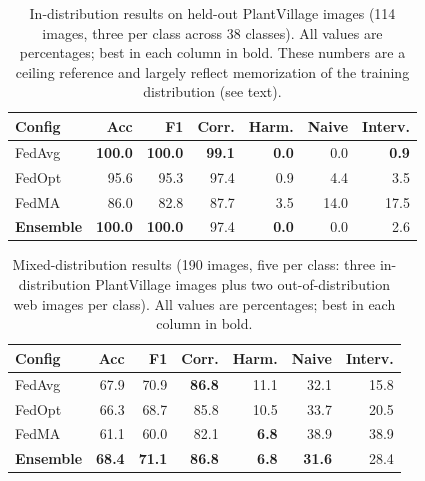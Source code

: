 \documentclass[conference]{IEEEtran}
\begin{document}
\begin{table}[t]
\centering
\caption{In-distribution results on held-out PlantVillage images (114 images, three per class across 38 classes). All values are percentages; best in each column in bold. These numbers are a ceiling reference and largely reflect memorization of the training distribution (see text).}
\label{tab:results_id}
\small
\setlength{\tabcolsep}{4pt}
\begin{tabular}{lrrrrrr}
\toprule
\textbf{Config} & \textbf{Acc} & \textbf{F1} & \textbf{Corr.} & \textbf{Harm.} & \textbf{Naive} & \textbf{Interv.} \\
\midrule
FedAvg & \textbf{100.0} & \textbf{100.0} & \textbf{99.1} & \textbf{0.0} & 0.0 & \textbf{0.9} \\
FedOpt & 95.6 & 95.3 & 97.4 & 0.9 & 4.4 & 3.5 \\
FedMA & 86.0 & 82.8 & 87.7 & 3.5 & 14.0 & 17.5 \\
\textbf{Ensemble} & \textbf{100.0} & \textbf{100.0} & 97.4 & \textbf{0.0} & 0.0 & 2.6 \\
\bottomrule
\end{tabular}
\end{table}

\begin{table}[t]
\centering
\caption{Mixed-distribution results (190 images, five per class: three in-distribution PlantVillage images plus two out-of-distribution web images per class). All values are percentages; best in each column in bold.}
\label{tab:results_mixed}
\small
\setlength{\tabcolsep}{4pt}
\begin{tabular}{lrrrrrr}
\toprule
\textbf{Config} & \textbf{Acc} & \textbf{F1} & \textbf{Corr.} & \textbf{Harm.} & \textbf{Naive} & \textbf{Interv.} \\
\midrule
FedAvg & 67.9 & 70.9 & \textbf{86.8} & 11.1 & 32.1 & 15.8 \\
FedOpt & 66.3 & 68.7 & 85.8 & 10.5 & 33.7 & 20.5 \\
FedMA & 61.1 & 60.0 & 82.1 & \textbf{6.8} & 38.9 & 38.9 \\
\textbf{Ensemble} & \textbf{68.4} & \textbf{71.1} & \textbf{86.8} & \textbf{6.8} & \textbf{31.6} & 28.4 \\
\bottomrule
\end{tabular}
\end{table}
\end{document}
